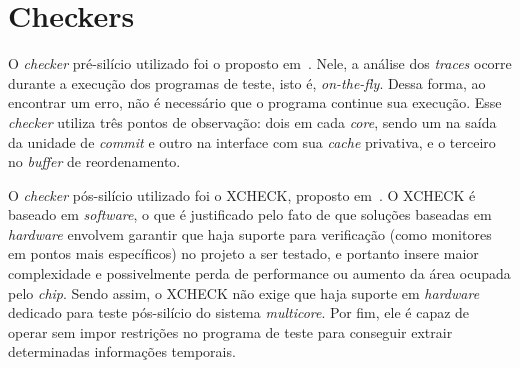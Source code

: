 \section{Checkers}

O \textit{checker} pré-silício utilizado foi o proposto em~\cite{Freitas:2013}.
Nele, a análise dos \textit{traces} ocorre durante a execução dos programas de
teste, isto é, \textit{on-the-fly}. Dessa forma, ao encontrar um erro, não é
necessário que o programa continue sua execução. Esse \textit{checker} utiliza
três pontos de observação: dois em cada \textit{core}, sendo um na saída da
unidade de \textit{commit} e outro na interface com sua \textit{cache}
privativa, e o terceiro no \textit{buffer} de reordenamento.

O \textit{checker} pós-silício utilizado foi o XCHECK, proposto
em~\cite{Hu:2012}. O XCHECK é baseado em \textit{software}, o que é justificado
pelo fato de que soluções baseadas em \textit{hardware} envolvem garantir que
haja suporte para verificação (como monitores em pontos mais específicos) no
projeto a ser testado, e portanto insere maior complexidade e possivelmente
perda de performance ou aumento da área ocupada pelo \textit{chip}. Sendo
assim, o XCHECK não exige que haja suporte em \textit{hardware} dedicado para
teste pós-silício do sistema \textit{multicore}. Por fim, ele é capaz de operar
sem impor restrições no programa de teste para conseguir extrair determinadas
informações temporais.
